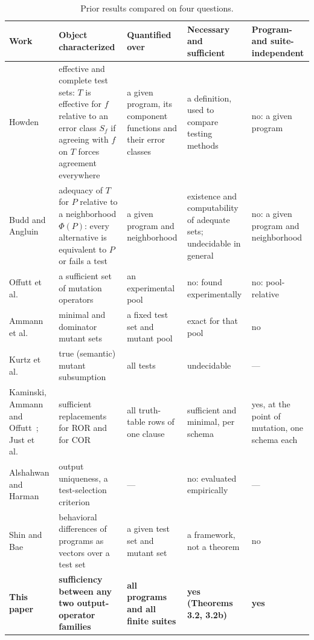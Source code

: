 \documentclass[conference]{IEEEtran}
\theoremstyle{run}
\begin{document}
\begin{table}[!t]\centering\footnotesize
\caption{Prior results compared on four questions.}
\label{tab:compare}
\begin{tabular}{L{2.9cm}L{3.9cm}L{3.2cm}L{3.0cm}L{2.8cm}}
\toprule
Work & Object characterized & Quantified over & Necessary and sufficient & Program- and suite-independent \\
\midrule
Howden~\cite{howden1982} & effective and complete test sets: $T$ is effective for $f$ relative to an error class $S_f$ if agreeing with $f$ on $T$ forces agreement everywhere & a given program, its component functions and their error classes & a definition, used to compare testing methods & no: a given program \\
Budd and Angluin~\cite{budd1982} & adequacy of $T$ for $P$ relative to a neighborhood $\Phi(P)$: every alternative is equivalent to $P$ or fails a test & a given program and neighborhood & existence and computability of adequate sets; undecidable in general & no: a given program and neighborhood \\
Offutt et al.~\cite{offutt1996} & a sufficient set of mutation operators & an experimental pool & no: found experimentally & no: pool-relative \\
Ammann et al.~\cite{ammann2014} & minimal and dominator mutant sets & a fixed test set and mutant pool & exact for that pool & no \\
Kurtz et al.~\cite{kurtz2015} & true (semantic) mutant subsumption & all tests & undecidable & --- \\
Kaminski, Ammann and Offutt~\cite{kaminski2013}; Just et al.~\cite{just2012} & sufficient replacements for ROR and for COR & all truth-table rows of one clause & sufficient and minimal, per schema & yes, at the point of mutation, one schema each \\
Alshahwan and Harman~\cite{alshahwan2014} & output uniqueness, a test-selection criterion & --- & no: evaluated empirically & --- \\
Shin and Bae~\cite{shin2016} & behavioral differences of programs as vectors over a test set & a given test set and mutant set & a framework, not a theorem & no \\
\textbf{This paper} & \textbf{sufficiency between any two output-operator families} & \textbf{all programs and all finite suites} & \textbf{yes (Theorems 3.2, 3.2b)} & \textbf{yes} \\
\bottomrule
\end{tabular}
\end{table}
\end{document}
